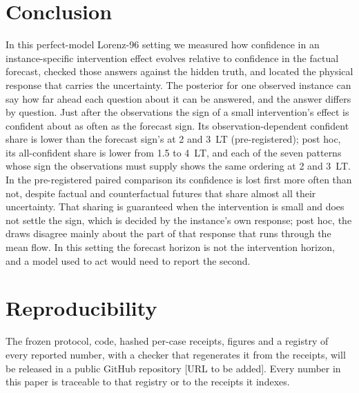 \documentclass[11pt]{article}
\begin{document}
\section{Conclusion}
In this perfect-model Lorenz-96 setting we measured how confidence in an instance-specific intervention effect evolves relative to confidence in the factual forecast, checked those answers against the hidden truth, and located the physical response that carries the uncertainty. The posterior for one observed instance can say how far ahead each question about it can be answered, and the answer differs by question. Just after the observations the sign of a small intervention's effect is confident about as often as the forecast sign. Its observation-dependent confident share is lower than the forecast sign's at 2 and 3~LT (pre-registered); post hoc, its all-confident share is lower from 1.5 to 4~LT, and each of the seven patterns whose sign the observations must supply shows the same ordering at 2 and 3~LT. In the pre-registered paired comparison its confidence is lost first more often than not, despite factual and counterfactual futures that share almost all their uncertainty. That sharing is guaranteed when the intervention is small and does not settle the sign, which is decided by the instance's own response; post hoc, the draws disagree mainly about the part of that response that runs through the mean flow. In this setting the forecast horizon is not the intervention horizon, and a model used to act would need to report the second.

\section*{Reproducibility}
The frozen protocol, code, hashed per-case receipts, figures and a registry of every reported number, with a checker that regenerates it from the receipts, will be released in a public GitHub repository [URL to be added]. Every number in this paper is traceable to that registry or to the receipts it indexes.




\appendix
\end{document}
